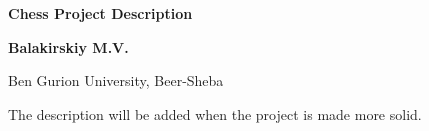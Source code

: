 \documentclass{article}
\begin{document}
\hoffset=0cm \voffset=0cm \textwidth=345pt \textheight=598pt

\begin{titlepage}

\begin{center}

\vspace*{1cm}
            
            \Huge
            \textbf{Chess Project Description}
            
            \vspace{0.5cm}
            \LARGE
            
            \vspace{1.5cm}
            
            \textbf{Balakirskiy M.V.}
           
            \vfill

\vspace{0.8cm} Ben Gurion University, Beer-Sheba\\

\end{center}

\end{titlepage}

\hoffset=-2cm \voffset=-2.5cm \textwidth=17cm \textheight=23cm

The description will be added when the project is made more solid.
\end{document}
